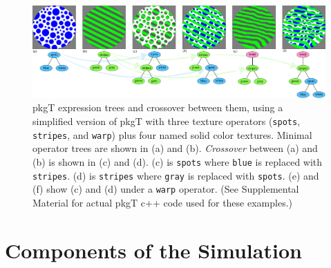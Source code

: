 \documentclass[letterpaper]{article}
\newcommand{\texsyn}[0]{pkgT}
\begin{document}
\begin{figure}
    \includegraphics[width=\textwidth]{texsyn_overview.pdf}
    \caption{\texsyn{} expression trees and crossover between them, using a simplified version of \texsyn{} with three texture operators (\texttt{spots}, \texttt{stripes}, and \texttt{warp}) plus four named solid color textures. Minimal operator trees are shown in (a) and (b). \textit{Crossover} between (a) and (b) is shown in (c) and (d). (c) is \texttt{spots} where \texttt{blue} is replaced with \texttt{stripes}. (d) is \texttt{stripes} where \texttt{gray} is replaced with \texttt{spots}. (e) and (f) show (c) and (d) under a \texttt{warp} operator. (See Supplemental Material for actual \texsyn{} c++ code used for these examples.)}
    \label{fig:TexSyn_overview}
\end{figure}



\section{Components of the Simulation}
\end{document}
